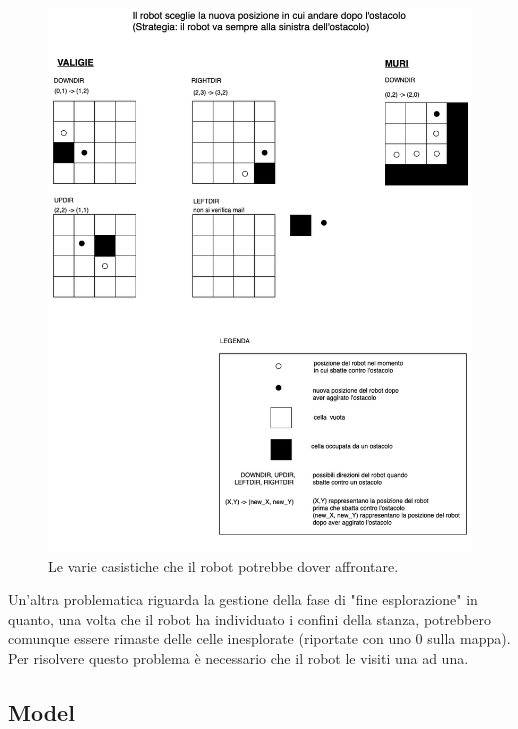 \begin{figure}[H]
  \includegraphics[scale=0.35]{img/sprint4/go_around_obstcl_strategy.png}
  \caption{Le varie casistiche che il robot potrebbe dover affrontare.}
  \label{fig:go_around_obstcl_strategy}
\end{figure}

Un'altra problematica riguarda la gestione della fase di "fine esplorazione" in quanto, una volta che il robot ha individuato i confini della stanza, potrebbero comunque essere rimaste delle celle inesplorate (riportate con uno 0 sulla mappa). Per risolvere questo problema è necessario che il robot le visiti una ad una.

\subsection{Model}

